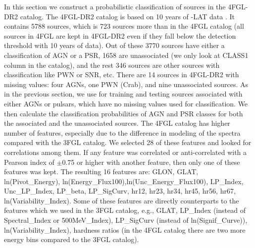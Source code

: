 In this section we construct a probabilistic classification of sources in the 4FGL-DR2 catalog. The 4FGL-DR2 catalog \citep{2020arXiv200511208B} 
is based on 10 years of \Fermi-LAT data \citep[compared to 8 years of data in the 4FGL catalog,][]{2020ApJS..247...33A}.
It contains 5788 sources, which is 723 sources more than in the 4FGL catalog (all sources in 4FGL are kept in 4FGL-DR2 even if they fall
below the detection threshold with 10 years of data). Out of these 3770 sources have either a classification of AGN or a PSR, 1658 are unassociated (we only look at CLASS1 column in the catalog), and the rest 346 sources are other sources with classification like PWN or SNR, etc.
There are 14 sources in 4FGL-DR2 with missing values: four AGNs, one PWN (Crab), and nine unassociated sources.
As in the previous section, we use for training and testing sources associated with either AGNs or pulsars,
which have no missing values used for classification.%
We then calculate the classification probabilities of AGN and PSR classes for both the associated and the unassociated sources.
The 4FGL catalog has higher number of features, especially due to the difference in modeling of the spectra compared with the 3FGL catalog. 
We selected 28 of these features and looked for correlations among them. If any feature was correlated or anti-correlated with a Pearson index of $\pm$0.75 or higher with another feature, then only one of these features was kept. 
The resulting 16 features are:
GLON, GLAT, ln(Pivot\_Energy), ln(Energy\_Flux100),ln(Unc\_Energy\_Flux100), LP\_Index, Unc\_LP\_Index, LP\_beta, LP\_SigCurv, hr12, hr23, hr34, hr45, hr56, hr67, ln(Variability\_Index).
Some of these features are directly counterparts to the features which we used in the 3FGL catalog,
e.g., GLAT, LP\_Index (instead of Spectral\_Index or 500MeV\_Index), LP\_SigCurv (instead of ln(Signif\_Curve)), 
ln(Variability\_Index), hardness ratios (in the 4FGL catalog there are two more energy bins compared to the 3FGL catalog).

